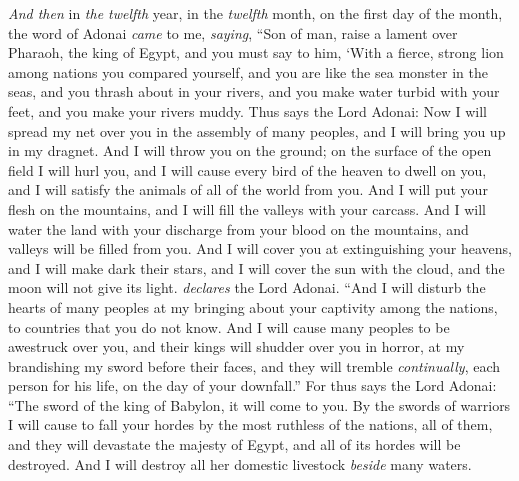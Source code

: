 \begin{biblechapter} %
 \textit{And then} in \textit{the twelfth} year, in the \textit{twelfth} month, on the first day of the month, the word of Adonai \textit{came} to me, \textit{saying},
\verse “Son of man, raise a lament over Pharaoh, the king of Egypt, and you must say to him, ‘With a fierce, strong lion among nations you compared yourself, 
and you are like the sea monster in the seas, 
and you thrash about in your rivers, 
and you make water turbid with your feet, 
and you make your rivers muddy.
\verse Thus says the Lord Adonai:
\verse Now I will spread my net over you 
in the assembly of many peoples, 
and I will bring you up in my dragnet.
\verse And I will throw you on the ground; 
on the surface of the open field I will hurl you, 
and I will cause every bird of the heaven to dwell on you, 
and I will satisfy the animals of all of the world from you.
\verse And I will put your flesh on the mountains, 
and I will fill the valleys with your carcass.
\verse And I will water the land with your discharge from your blood 
on the mountains, 
and valleys will be filled from you.
\verse And I will cover you at extinguishing your heavens, 
and I will make dark their stars, 
and I will cover the sun with the cloud, 
and the moon will not give its light. \textit{declares} the Lord Adonai.
\verse “And I will disturb the hearts of many peoples 
at my bringing about your captivity among the nations, 
to countries that you do not know.
\verse And I will cause many peoples to be awestruck over you, 
and their kings will shudder over you in horror, 
at my brandishing my sword before their faces, 
and they will tremble \textit{continually}, 
each person for his life, 
on the day of your downfall.”
\verse For thus says the Lord Adonai:
\verse “The sword of the king of Babylon, 
it will come to you.
\verse By the swords of warriors I will cause to fall your hordes 
by the most ruthless of the nations, all of them, 
and they will devastate the majesty of Egypt, 
and all of its hordes will be destroyed.
\verse And I will destroy all her domestic livestock 
\textit{beside} many waters. 

\end{biblechapter}
